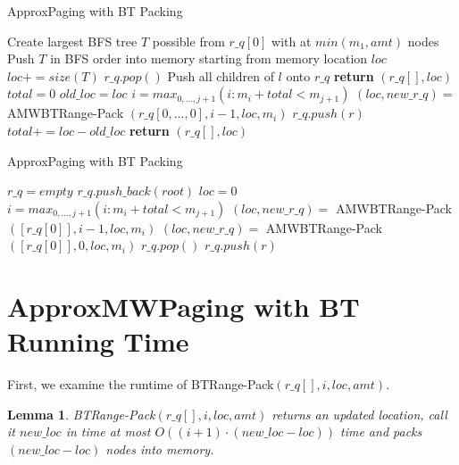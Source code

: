 \documentclass[letterpaper,12pt,titlepage,oneside,final]{book}
\theoremstyle{plain}
\newtheorem{lem}[thm]{Lemma}
\begin{document}
\begin{algorithm}[H]
\caption{ApproxPaging with BT Packing}
\label{AMWBTPack}
\begin{algorithmic}[1]
	\State Create largest BFS tree $T$ possible from $r\_q[0]$ with at $min(m_1, amt)$ nodes
	\State Push $T$ in BFS order into memory starting from memory location $loc$
	\State $loc += size(T)$
	\State $r\_q.pop()$
		\State Push all children of $l$ onto $r\_q$
	\EndFor
	\State \textbf{return} $(r\_q[], loc)$		
\Else
	\State $total = 0$
		\State $old\_loc = loc$
		\State $i = max_{0,...,j+1}(i : m_i + total < m_{j+1})$
		\State $(loc, new\_r\_q) =$ AMWBT\textendash Range-Pack $(r\_q[0,...,0], i-1, loc, m_i)$
			\State $r\_q.push(r)$
		\EndFor
		\State $total += loc-old\_loc$
	\EndWhile
	\State \textbf{return} $(r\_q[], loc)$
\EndIf
\EndProcedure
\end{algorithmic}
\end{algorithm}

\begin{algorithm}[H]
\caption{ApproxPaging with BT Packing}
\label{AMWBTPack}
\begin{algorithmic}[1]
\State $r\_q = empty$
\State $r\_q.push\_back(root)$
\State $loc = 0$
			\State $i = max_{0,...,j+1}(i : m_i + total < m_{j+1})$
			\State $(loc, new\_r\_q) =$ AMWBT\textendash Range-Pack $([r\_q[0]], i-1, loc, m_i)$		
		\Else
			\State $(loc, new\_r\_q) =$ AMWBT\textendash Range-Pack $([r\_q[0]], 0, loc, m_i)$
		\EndIf
		\State $r\_q.pop()$
			\State $r\_q.push(r)$
		\EndFor
	\EndWhile
\EndFor
\EndProcedure
\end{algorithmic}
\end{algorithm}


\section{ApproxMWPaging with BT Running Time }

First, we examine the runtime of BT\textendash Range-Pack$(r\_q[], i, loc, amt)$.

\begin{lem}
BT\textendash Range-Pack$(r\_q[], i, loc, amt)$ returns an updated location, call it $new\_loc$ in time at most $O((i+1)\cdot (new\_loc - loc))$ time and packs $(new\_loc - loc)$ nodes into memory.
\end{lem}
\end{document}
